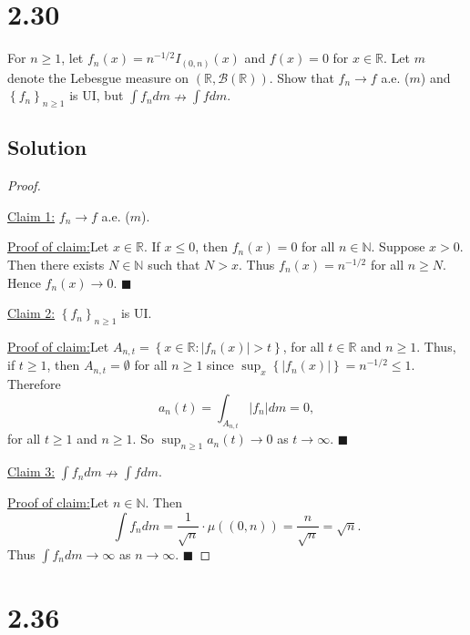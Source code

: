 \documentclass[12pt]{article}
\newenvironment{claimproof}[1]{\par\noindent\underline{Proof of claim:}\space#1}{\hfill $\blacksquare$\vspace{3mm}}
\begin{document}
\newpage 
\section*{2.30}
For $n \geq 1$, let $f_{n}(x) = n^{-1/2}I_{(0,n)}(x)$ and $f(x) = 0$ for $x \in \mathbb{R}$. Let $m$ denote the Lebesgue measure on 
$\left( \mathbb{R}, \mathcal{B}(\mathbb{R}) \right)$. Show that $f_{n} \rightarrow f$ a.e. ($m$) and $\left\{ f_{n} \right\}_{n\geq 1}$ is UI, but
$\int f_{n}dm \nrightarrow \int fdm$.

\subsection*{Solution}
\begin{proof}
$\ $

\underline{Claim 1:} $f_{n} \rightarrow f$ a.e. ($m$).
\begin{claimproof}
Let $x \in \mathbb{R}$. If $x \leq 0$, then $f_{n}(x) = 0$ for all $n \in \mathbb{N}$. Suppose $x > 0$. Then there exists $N\in\mathbb{N}$ such that $N >
x$. Thus $f_{n}(x) = n^{-1/2}$ for all $n \geq N$. Hence $f_{n}(x) \rightarrow 0$.
\end{claimproof}

\underline{Claim 2:} $\left\{ f_{n} \right\}_{n\geq 1}$ is UI.
\begin{claimproof}
Let $A_{n,t} = \left\{ x \in \mathbb{R} : |f_{n}(x)| > t \right\}$, for all $t \in \mathbb{R}$ and $n\geq 1$. Thus, if $t \geq 1$, then $A_{n,t} =
\emptyset$ for all $n \geq 1$ since $\sup_{x}\left\{ |f_{n}(x)| \right\} = n^{-1/2} \leq 1$. Therefore 
\[ a_{n}(t) = \int_{A_{n,t}}|f_{n}|dm = 0, \]
for all $t \geq 1$ and $n \geq 1$. So $\sup_{n\geq 1}a_{n}(t) \rightarrow 0$ as $t\rightarrow \infty$.
\end{claimproof}

\underline{Claim 3:} $\int f_{n} dm \nrightarrow \int fdm$.
\begin{claimproof}
Let $n \in \mathbb{N}$. Then 
\[ \int f_{n}dm  = \frac{1}{\sqrt{n}}\cdot \mu\left( (0,n) \right) = \frac{n}{\sqrt{n}} = \sqrt{n}. \]
Thus $\int f_{n}dm \rightarrow \infty$ as $n\rightarrow \infty$.
\end{claimproof}

\vspace{-5mm}
\end{proof}


\newpage 
\section*{2.36}
\end{document}
